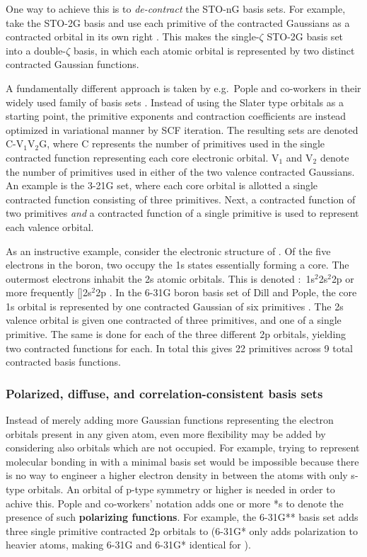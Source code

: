 \documentclass[../../master.tex]{subfiles}
\begin{document}
One way to achieve this is to \emph{de-contract} the \mbox{STO-nG} basis sets. For example, take the \mbox{STO-2G} basis and use each primitive of the contracted Gaussians as a contracted orbital in its own right \cite{cramer}. This makes the single-$\zeta$ \mbox{STO-2G} basis set into a double-$\zeta$ basis, in which each atomic orbital is represented by two distinct contracted Gaussian functions.

A fundamentally different approach is taken by e.g.\ Pople and co-workers in their widely used family of basis sets \cite{hehre1972}. Instead of using the Slater type orbitals as a starting point, the primitive exponents and contraction coefficients are instead optimized in variational manner by SCF iteration. The resulting sets are denoted \mbox{C-V${}_1$V${}_2$G}, where C represents the number of primitives used in the single contracted function representing each core electronic orbital. V${}_1$ and V${}_2$ denote the number of primitives used in either of the two valence contracted Gaussians. An example is the \mbox{3-21G} set, where each core orbital is allotted a single contracted function consisting of three primitives. Next, a contracted function of two primitives \emph{and} a contracted function of a single primitive is used to represent each valence orbital. 

As an instructive example, consider the electronic structure of . Of the five electrons in the boron, two occupy the 1s states essentially forming a  core. The outermost electrons inhabit the 2s atomic orbitals. This is denoted \mbox{: 1s${}^2$2s${}^2$2p} or more frequently \mbox{[]2s${}^2$2p} \cite{griffiths}. In the \mbox{6-31G} boron basis set of Dill and Pople, the core 1s orbital is represented by one contracted Gaussian of six primitives \cite{dill1975}. The 2s valence orbital is given one contracted of three primitives, and one of a single primitive. The same is done for each of the three different 2p orbitals, yielding two contracted functions for each. In total this gives 22 primitives across 9 total contracted basis functions.

\subsubsection{Polarized, diffuse, and correlation-consistent basis sets}
Instead of merely adding more Gaussian functions representing the electron orbitals present in any given atom, even more flexibility may be added by considering also orbitals which are not occupied. For example, trying to represent molecular bonding in  with a minimal basis set would be impossible because there is no way to engineer a higher electron density in between the atoms with only s-type orbitals. An orbital of p-type symmetry or higher is needed in order to achive this. Pople and co-workers' notation adds one or more *s to denote the presence of such {\bf polarizing functions}. For example, the 6-31G** basis set adds three single primitive contracted 2p orbitals to  (6-31G* only adds polarization to heavier atoms, making 6-31G and 6-31G* identical for ). 
\end{document}
